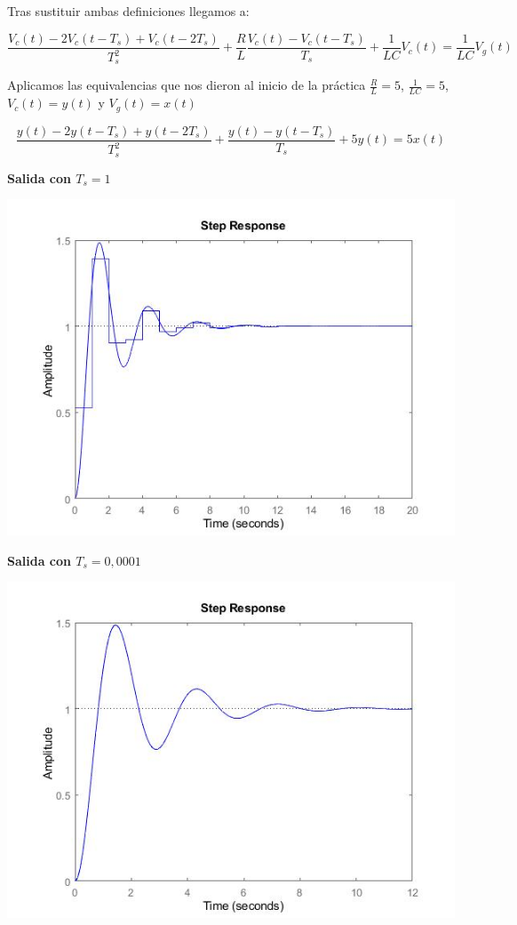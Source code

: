 \noindent Tras sustituir ambas definiciones llegamos a:

\begin{equation}
\frac{V_c(t)-2V_c(t-T_s)+V_c(t-2T_s)}{T_s^2}+\frac{R}{L}\frac{V_c(t)-V_c(t-T_s)}{T_s}+\frac{1}{LC}V_c(t)=\frac{1}{LC}V_g(t)
\end{equation}

\noindent Aplicamos las equivalencias que nos dieron al inicio de la práctica $\frac{R}{L}=5$, $\frac{1}{LC}=5$, $V_c(t)=y(t)$ y $V_g(t)=x(t)$

\begin{equation}
\frac{y(t)-2y(t-T_s)+y(t-2T_s)}{T_s^2}+\frac{y(t)-y(t-T_s)}{T_s}+5y(t)=5x(t)
\end{equation}

\noindent \textbf{Salida con $T_s=1$}

\noindent \includegraphics[scale=0.6]{./img2/SalidaTs1}

\noindent \textbf{Salida con $T_s=0,0001$}

\noindent \includegraphics[scale=0.6]{./img2/SalidaTs00001}


